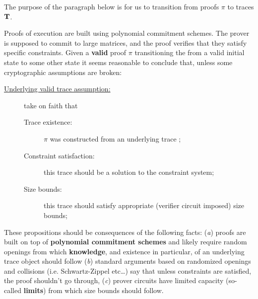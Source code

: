 The purpose of the paragraph below is for us to transition from proofs $\pi$ to traces $\textbf{T}$.

Proofs of \zkEvm{} execution are built using polynomial commitment schemes. The prover is supposed to commit to large matrices, and the proof verifies that they satisfy specific constraints. Given a \textbf{valid} \zkEvm{} proof $\pi$ transitioning the \zkEvm{} from a valid initial state to some other state it seems reasonable to conclude that, unless some cryptographic assumptions are broken:
\begin{description}
	\item[\quad \underline{Underlying valid trace assumption:}] take on faith that 
		\begin{description}
			\item[\quad Trace existence:] $\pi$ was constructed from an underlying trace \fullTrace{};
			\item[\quad Constraint satisfaction:] this trace should be a solution to the \zkEvm{} constraint system; 
			\item[\quad Size bounds:] this trace should satisfy appropriate (verifier circuit imposed) size bounds; 
		\end{description}
\end{description}
These propositions should be consequences of the following facts: 
(\emph{a})
proofs are built on top of \textbf{polynomial commitment schemes} and likely require random openings from which \textbf{knowledge}, and existence in particular, of an underlying trace object \fullTrace{} should follow
(\emph{b})
standard arguments based on randomized openings and collisions (i.e. Schwartz-Zippel etc\dots{}) say that unless constraints are satisfied, the proof shouldn't go through,
(\emph{c})
prover circuits have limited capacity (so-called \textbf{limits}) from which size bounds should follow.

